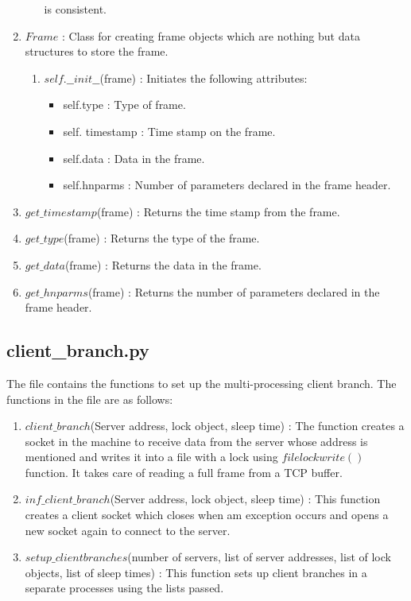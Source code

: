 \begin{enumerate}
\begin{enumerate}
				is consistent.
		\end{enumerate}
	\item $Frame$ : Class for creating frame objects which are nothing but data
		structures to store the frame.
		\begin{enumerate}
			\item $self.\_\_init\_\_$(frame) : Initiates the following attributes:
				\begin{itemize}
					\item self.type : Type of frame.
					\item self. timestamp : Time stamp on the frame.
					\item self.data : Data in the frame.
					\item self.hnparms : Number of parameters declared in the
						frame header.
				\end{itemize}
		\end{enumerate}
	\item $get\_timestamp$(frame) : Returns the time stamp from the frame.
	\item $get\_type$(frame) : Returns the type of the frame.
	\item $get\_data$(frame) : Returns the data in the frame.
	\item $get\_hnparms$(frame) : Returns the number of parameters declared in
		the frame header.
\end{enumerate}


\subsection{client\_branch.py}
The file contains the functions to set up the multi-processing client branch.
The functions in the file are as follows:
\begin{enumerate}
	\item $client\_branch$(Server address, lock object, sleep time) : The
		function creates a socket in the machine to receive data from the
		server whose address is mentioned and writes it into a file with a
		lock using $filelockwrite()$ function. It takes care of reading a full
		frame from a TCP buffer.
	\item $inf\_client\_branch$(Server address, lock object, sleep time) : This
		function creates a client socket which closes when am exception occurs
		and opens a new socket again to connect to the server.
	\item $setup\_clientbranches$(number of servers, list of server addresses,
		list of lock objects, list of sleep times) : This function sets up
		client branches in a separate processes using the lists passed.
\end{enumerate}


